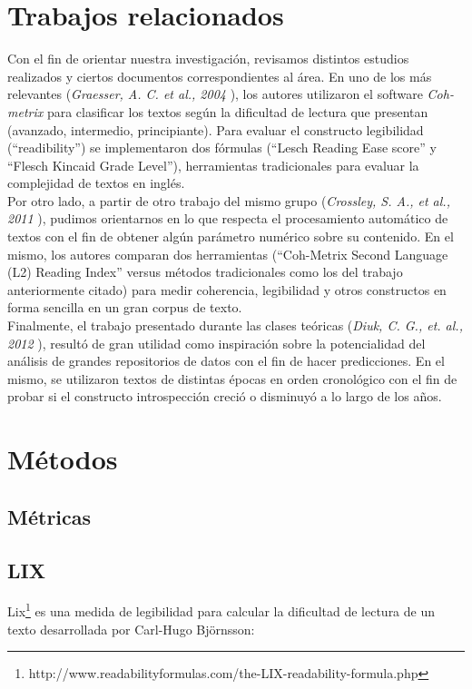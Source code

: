 \documentclass[12pt,journal,compsoc]{IEEEtran}
\begin{document}
\section{Trabajos relacionados}
Con el fin de orientar nuestra investigación, revisamos distintos estudios realizados y ciertos documentos correspondientes al área. En uno de los más relevantes (\textit{Graesser, A. C. et al., 2004} \cite{graesser}), los autores utilizaron el software \textit{Coh-metrix} para clasificar los textos según la dificultad de lectura que presentan (avanzado, intermedio, principiante). Para evaluar el constructo legibilidad (``readibility'') se implementaron dos fórmulas (``Lesch Reading Ease score'' y ``Flesch Kincaid Grade Level''), herramientas tradicionales para evaluar la complejidad de textos en inglés.\\
Por otro lado, a partir de otro trabajo del mismo grupo (\textit{Crossley, S. A., et al., 2011} \cite{crossley}), pudimos orientarnos en lo que respecta el procesamiento automático de textos con el fin de obtener algún parámetro numérico sobre su contenido. En el mismo, los autores comparan dos herramientas (``Coh-Metrix Second Language (L2) Reading Index'' versus métodos tradicionales como los del trabajo anteriormente citado) para medir coherencia, legibilidad y otros constructos en forma sencilla en un gran corpus de texto.\\
Finalmente, el trabajo presentado durante las clases teóricas (\textit{Diuk, C. G., et. al., 2012} \cite{diuk}), resultó de gran utilidad como inspiración sobre la potencialidad del análisis de grandes repositorios de datos con el fin de hacer predicciones. En el mismo, se utilizaron  textos de distintas épocas en orden cronológico con el fin de probar si el constructo introspección creció o disminuyó a lo largo de los años.

\section{Métodos}

\subsection{Métricas}
\subsection{LIX}

Lix\footnote{http://www.readabilityformulas.com/the-LIX-readability-formula.php} es una medida de legibilidad para calcular la dificultad de lectura de un texto desarrollada por Carl-Hugo Björnsson:
\end{document}
